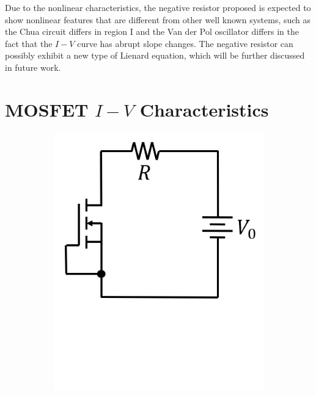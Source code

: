 \documentclass[%
 aip,
amsmath,amssymb,
reprint,
]{revtex4-1}
\begin{document}
Due to the nonlinear characteristics, the negative resistor proposed is expected to show nonlinear features that are different from other well known systems, such as the Chua circuit\cite{chua_circuit} differs in region I and the Van der Pol oscillator\cite{VanDerPol} differs in the fact that the $I-V$ curve has abrupt slope changes. The negative resistor can possibly exhibit a new type of Lienard equation, which will be further discussed in future work. 



\appendix

\section{\label{mosfetiv}MOSFET $I-V$ Characteristics}


\begin{figure}[!htbp]
  \begin{subfigure}{0.15\textwidth}
    \includegraphics[width=\linewidth]{figures/MOSFET_circuit.png}
    \caption{}
    \label{MOSFET_circuitfig_a}
  \end{subfigure}%

\end{figure}
\end{document}
